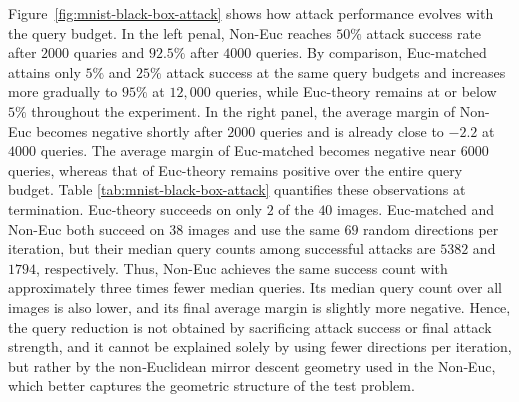 \documentclass[11pt]{article}
\numberwithin{equation}{section}
\begin{document}
Figure~\ref{fig:mnist-black-box-attack} shows how attack performance evolves with  the query budget. In the left penal, Non-Euc reaches  \(50\%\) attack success rate after \(2000\) quaries and
\(92.5\%\) after \(4000\) queries. By comparison, Euc-matched attains only \(5\%\) and \(25\%\) attack success at the
same query budgets and increases more gradually to \(95\%\) at \(12{,}000\) queries, while Euc-theory 
remains at or below \(5\%\) throughout the experiment. In the right panel, the average margin of Non-Euc becomes negative shortly after \(2000\) queries and is already close to \(-2.2\) at \(4000\) queries. The average margin of Euc-matched becomes negative near \(6000\) queries, whereas that of Euc-theory remains positive over the entire query budget. Table \ref{tab:mnist-black-box-attack} quantifies these observations at termination. Euc-theory succeeds on only \(2\) of the \(40\) images. Euc-matched and Non-Euc both succeed on \(38\) images and
use the same \(69\) random directions per iteration, but their median query counts among successful
attacks are \(5382\) and \(1794\), respectively. Thus, Non-Euc achieves the same success count with
approximately three times fewer median queries.  Its median query count over all images is also lower, and its final average margin is slightly more negative. Hence, the query reduction is not obtained by sacrificing attack success
or final attack strength, and it cannot be explained solely by using fewer directions per iteration, but rather by the non‑Euclidean mirror descent geometry used in the Non‑Euc, which better captures the geometric structure of the test  problem. 
\end{document}

